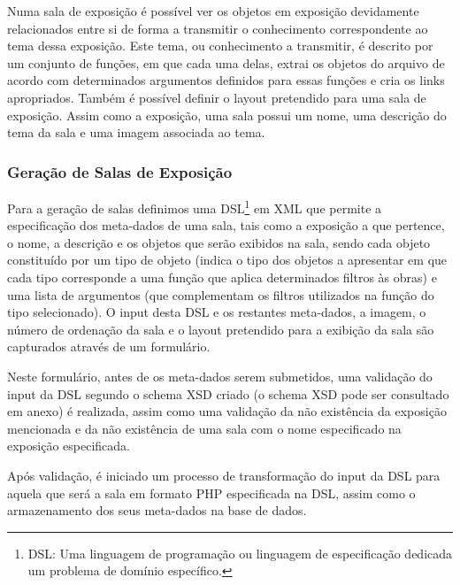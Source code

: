 \documentclass[letterpaper]{article}
\begin{document}
{
Numa sala de exposi\c{c}\~ao \'e poss\'ivel ver os objetos em
exposi\c{c}\~ao devidamente relacionados entre si de forma a transmitir
o conhecimento correspondente ao tema dessa exposi\c{c}\~ao. Este tema,
ou conhecimento a transmitir, \'e descrito por um conjunto de
fun\c{c}\~oes, em que cada uma delas, extrai os objetos do arquivo de
acordo com determinados argumentos definidos para essas fun\c{c}\~oes e
cria os links apropriados. Tamb\'em \'e poss\'ivel definir o layout
pretendido para uma sala de exposi\c{c}\~ao. Assim como a
exposi\c{c}\~ao, uma sala possui um nome, uma descri\c{c}\~ao do tema
da sala e uma imagem associada ao tema.}


\bigskip

\subsubsection[Gera\c{c}\~ao de Salas de
Exposi\c{c}\~ao]{ Gera\c{c}\~ao de Salas de
Exposi\c{c}\~ao}
{
Para a gera\c{c}\~ao de salas definimos uma DSL\footnote{DSL: Uma
linguagem de programa\c{c}\~ao ou linguagem de especifica\c{c}\~ao
dedicada um problema de dom\'inio espec\'ifico.} em XML que permite a
especifica\c{c}\~ao dos meta-dados de uma sala, tais como a
exposi\c{c}\~ao a que pertence, o nome, a descri\c{c}\~ao e os objetos
que ser\~ao exibidos na sala, sendo cada objeto constitu\'ido por um
tipo de objeto (indica o tipo dos objetos a apresentar em que cada tipo
corresponde a uma fun\c{c}\~ao que aplica determinados filtros \`as
obras) e uma lista de argumentos (que complementam os filtros
utilizados na fun\c{c}\~ao do tipo selecionado). O input desta DSL e os
restantes meta-dados, a imagem, o n\'umero de ordena\c{c}\~ao da sala e
o layout pretendido para a exibi\c{c}\~ao da sala s\~ao capturados
atrav\'es de um formul\'ario.}

{
Neste formul\'ario, antes de os meta-dados serem submetidos, uma
valida\c{c}\~ao do input da DSL segundo o schema XSD criado (o schema
XSD pode ser consultado em anexo) \'e realizada, assim como uma
valida\c{c}\~ao da n\~ao exist\^encia da exposi\c{c}\~ao mencionada e
da n\~ao exist\^encia de uma sala com o nome especificado na
exposi\c{c}\~ao especificada.}

{
Ap\'os valida\c{c}\~ao, \'e iniciado um processo de transforma\c{c}\~ao
do input da DSL para aquela que ser\'a a sala em formato PHP
especificada na DSL, assim como o armazenamento dos seus meta-dados na
base de dados.}
\end{document}
